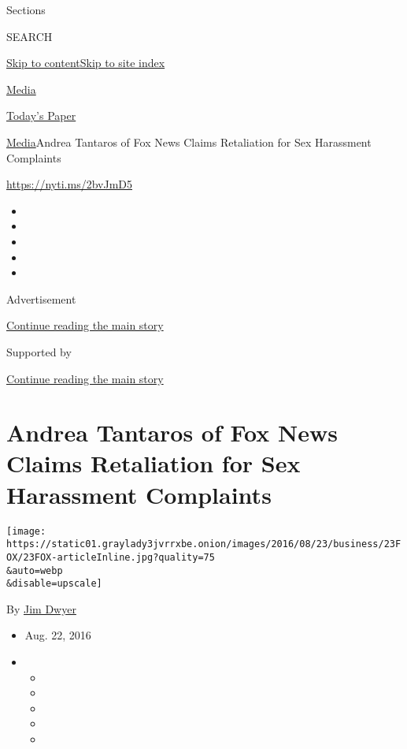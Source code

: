 Sections

SEARCH

\protect\hyperlink{site-content}{Skip to
content}\protect\hyperlink{site-index}{Skip to site index}

\href{https://www.nytimes3xbfgragh.onion/pages/business/media/index.html}{Media}

\href{https://myaccount.nytimes3xbfgragh.onion/auth/login?response_type=cookie\&client_id=vi}{}

\href{https://www.nytimes3xbfgragh.onion/section/todayspaper}{Today's
Paper}

\href{/pages/business/media/index.html}{Media}\textbar{}Andrea Tantaros
of Fox News Claims Retaliation for Sex Harassment Complaints

\url{https://nyti.ms/2bvJmD5}

\begin{itemize}
\item
\item
\item
\item
\item
\end{itemize}

Advertisement

\protect\hyperlink{after-top}{Continue reading the main story}

Supported by

\protect\hyperlink{after-sponsor}{Continue reading the main story}

\hypertarget{andrea-tantaros-of-fox-news-claims-retaliation-for-sex-harassment-complaints}{%
\section{Andrea Tantaros of Fox News Claims Retaliation for Sex
Harassment
Complaints}\label{andrea-tantaros-of-fox-news-claims-retaliation-for-sex-harassment-complaints}}

\texttt{[image: https://static01.graylady3jvrrxbe.onion/images/2016/08/23/business/23FOX/23FOX-articleInline.jpg?quality=75\\\&auto=webp\\\&disable=upscale]}

By \href{http://www.nytimes3xbfgragh.onion/by/jim-dwyer}{Jim Dwyer}

\begin{itemize}
\item
  Aug. 22, 2016
\item
  \begin{itemize}
  \item
  \item
  \item
  \item
  \item
  \end{itemize}
\end{itemize}

